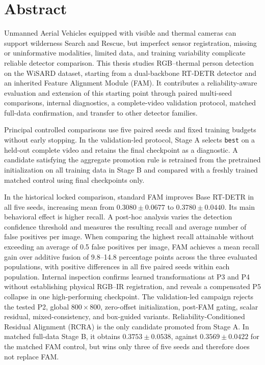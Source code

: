 \chapter*{Abstract}

Unmanned Aerial Vehicles equipped with visible and thermal cameras can support
wilderness Search and Rescue, but imperfect sensor registration, missing or
uninformative modalities, limited data, and training variability complicate
reliable detector comparison. This thesis studies RGB--thermal person detection
on the WiSARD dataset, starting from a dual-backbone RT-DETR detector and an
inherited Feature Alignment Module (FAM). It contributes a reliability-aware
evaluation and extension of this starting point through paired multi-seed
comparisons, internal diagnostics, a complete-video validation protocol,
matched full-data confirmation, and transfer to other detector families.

Principal controlled comparisons use five paired seeds and fixed training
budgets without early stopping. In the validation-led protocol, Stage A selects
\texttt{best} on a held-out complete video and retains the final checkpoint as
a diagnostic. A candidate satisfying the aggregate promotion rule is retrained
from the pretrained initialization on all training data in Stage B and compared
with a freshly trained matched control using final checkpoints only.

In the historical locked comparison, standard FAM improves Base RT-DETR in all
five seeds, increasing mean \mapfifty{} from \(0.3080\pm0.0677\) to
\(0.3780\pm0.0440\). Its main behavioral effect is higher recall. A post-hoc
analysis varies the detection confidence threshold and measures the resulting
recall and average number of false positives per image. When comparing the highest
recall attainable without exceeding an average of 0.5 false positives per image,
FAM achieves a mean recall gain over additive fusion of 9.8--14.8 percentage
points across the three evaluated populations, with positive differences in all
five paired seeds within each population. Internal inspection confirms learned
transformations at P3 and P4 without establishing physical RGB--IR registration,
and reveals a compensated P5 collapse in one high-performing checkpoint. The
validation-led campaign rejects the tested P2, global \(800\times800\),
zero-offset initialization, post-FAM gating, scalar residual, mixed-consistency,
and box-guided variants. Reliability-Conditioned Residual Alignment (RCRA) is
the only candidate promoted from Stage A. In matched full-data Stage B, it obtains
\(0.3753\pm0.0538\), against \(0.3569\pm0.0422\) for the matched FAM control,
but wins only three of five seeds and therefore does not replace FAM.

